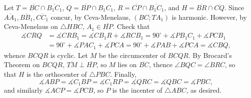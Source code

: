 Let $T=\overline{BC}\cap\overline{B_1C_1}$, $Q=\overline{BP}\cap{B_1C_1}$, $R=\overline{CP}\cap\overline{B_1C_1}$, and $H=\overline{BR}\cap\overline{CQ}$. Since $\overline{AA_1},\overline{BB_1},\overline{CC_1}$ concur, by Ceva-Menelaus, $(BC;TA_1)$ is harmonic. However, by Ceva-Menelaus on $\triangle HBC$, $A_1\in\overline{HP}$. Check that
\begin{align*}
    \measuredangle CRQ&=\measuredangle CRB_1=\measuredangle CB_1R+\measuredangle RCB_1=90^\circ+\measuredangle PB_1C_1+\measuredangle PCB_1\\
    &=90^\circ+\measuredangle PAC_1+\measuredangle PCA=90^\circ+\measuredangle PAB+\measuredangle PCA=\measuredangle CBQ,
\end{align*}
whence $BCQR$ is cyclic. Let $M$ be the circumcenter of $BCQR$. By Brocard's Theorem on $BCQR$, $\overline{TM}\perp\overline{HP}$, so $M$ lies on $\overline{BC}$, thence $\angle BQC=\angle BRC$, so that $H$ is the orthocenter of $\triangle PBC$. Finally, \[\measuredangle ABP=\measuredangle C_1BP=\measuredangle C_1RP=\measuredangle QRC=\measuredangle QBC=\measuredangle PBC,\]
and similarly $\measuredangle ACP=\measuredangle PCB$, so $P$ is the incenter of $\triangle ABC$, as desired. 
